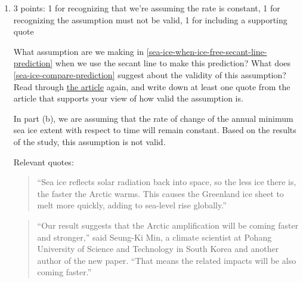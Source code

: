 \documentclass{article}
\makeatletter
\let\@href=\href
\renewcommand{\href}[2]{\@href{#1}{\ul{#2}}}
\makeatother
\begin{document}
\begin{enumerate}
\begin{enumerate}
    \begin{solution}
      The study's prediction is much earlier than our secant line prediction.
    \end{solution}

  \item

    \begin{grading}
      3 points: 1 for recognizing that we're assuming the rate is constant, 1 for recognizing the assumption must not be valid, 1 for including a supporting quote 
    \end{grading}

    \begin{problem}[\vfill]
      What assumption are we making in \ref{sea-ice-when-ice-free-secant-line-prediction} when we use the secant line to make this prediction? What does \ref{sea-ice-compare-prediction} suggest about the validity of this assumption? Read through \href{https://www.nytimes.com/2023/06/06/climate/arctic-sea-ice-melting.html?unlocked_article_code=1.HU4.c_XS.kUPtWv2pzsvT&smid=url-share}{the article} again, and write down at least one quote from the article that supports your view of how valid the assumption is.
    \end{problem}

    \begin{solution}
      In part (b), we are assuming that the rate of change of the annual minimum sea ice extent with respect to 
      time will remain constant. Based on the results of the study, this assumption is not valid. 
      
      Relevant quotes:
        \begin{quote}
          ``Sea ice reflects solar radiation back into space, so the less ice there is, the faster the Arctic warms. This causes the Greenland ice sheet to melt more quickly, adding to sea-level rise globally.''
        \end{quote}
        \begin{quote}
          ``Our result suggests that the Arctic amplification will be coming faster and stronger,'' said Seung-Ki Min, a climate scientist at Pohang University of Science and Technology in South Korea and another author of the new paper. ``That means the related impacts will be also coming faster.''
        \end{quote}
    \end{solution}

    


  \end{enumerate}


\end{enumerate}
\end{document}
